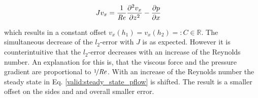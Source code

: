 \begin{align}
\label{valid:steady_state_pflow}
 J v_x &=  \frac{1}{\Rey}\frac{\partial^2 v_x}{\partial z^2} -\pdn[p]{x}
\end{align}

which results in a constant offset $v_x(h_1) = v_x(h_2) =: C\in\mathbb{R}$.
The simultaneous decrease of the $l_2$-error with $J$ is as expected.
However it is counterintuitive that the $l_2$-error decreases with an increase of the Reynolds number.
An explanation for this is, that the viscous force and the pressure gradient are proportional to $\nicefrac{1}{\mbox{\textit{Re}}}$.
With an increase of the Reynolds number the steady state in Eq. \ref{valid:steady_state_pflow} is shifted.
The result is a smaller offset on the sides and and overall smaller error.

\begin{figure}[!tp]%
    \centering
    \qquad

\end{figure}

